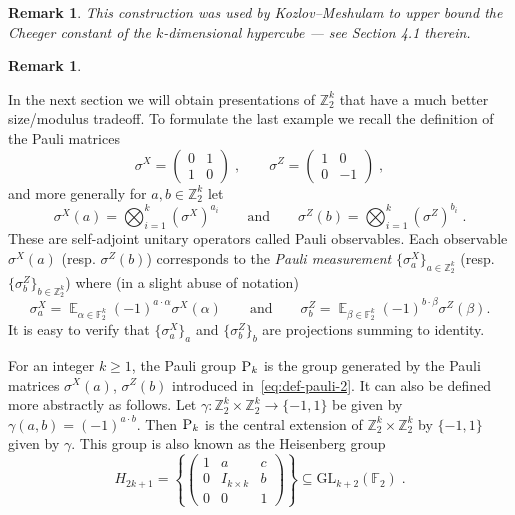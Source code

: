 \documentclass[11pt]{article}
\newtheorem{remark}[theorem]{Remark}
\theoremstyle{definition}
\DeclareMathOperator*{\Expectation}{\mathbb{E}}
\newcommand{\Es}[1]{\Expectation_{#1}}
\newcommand{\F}{\ensuremath{\mathbb{F}}}
\newcommand{\Z}{\ensuremath{\mathbb{Z}}}
\newcommand{\gamestyle}[1]{\ensuremath{\textsc{#1}}\xspace}
\newcommand{\pauli}{\gamestyle{P}}
\begin{document}
\begin{remark}
    This construction was used by Kozlov--Meshulam \cite{kozlov2019quantitative} to upper bound the Cheeger constant of the $k$-dimensional hypercube --- see Section 4.1 therein.
\end{remark}

\begin{remark}
    
\end{remark}

In the next section we will obtain presentations of $\Z_2^k$ that have a much better size/modulus tradeoff.
To formulate the last example we recall the definition of the Pauli matrices
	\begin{equation}\label{eq:def-pauli-1} \sigma^X = \begin{pmatrix} 0 & 1 \\ 1 & 0 \end{pmatrix}\;,\qquad \sigma^Z = \begin{pmatrix} 1 & 0 \\ 0 & -1\end{pmatrix}\;,
	\end{equation}
	and more generally for $a,b\in \Z_2^k$ let 
	\begin{equation}\label{eq:def-pauli-2}
	\sigma^X(a) = \bigotimes_{i=1}^k (\sigma^X)^{a_i}\qquad\text{and}\qquad\sigma^Z(b) = \bigotimes_{i=1}^k (\sigma^Z)^{b_i}\;.
	\end{equation}
These are self-adjoint unitary operators called Pauli observables. Each observable $\sigma^X(a)$ (resp. $\sigma^Z(b)$) corresponds to the \emph{Pauli measurement} $\{ \sigma^X_a \}_{a \in \Z_2^k}$ (resp. $\{ \sigma^Z_b \}_{b \in \Z_2^k}$) where (in a slight abuse of notation)  
	\[ \sigma^X_a = \Es{\alpha\in\F_2^k} (-1)^{a\cdot \alpha} \sigma^X(\alpha)\qquad\text{and}\qquad\sigma^Z_b = \Es{\beta\in\F_2^k} (-1)^{b\cdot\beta} \sigma^Z(\beta).\]
	It is easy to verify that $\{\sigma^X_a\}_a$ and $\{\sigma^Z_b\}_b$ are projections summing to identity.	
	
For an integer $k\geq 1$,  the Pauli group $\pauli_k$ is the group generated by the Pauli matrices $\sigma^X(a)$, $\sigma^Z(b)$ introduced in~\eqref{eq:def-pauli-2}. It can also be defined more abstractly as follows. Let $\gamma: \Z_2^k\times \Z_2^k \to \{-1,1\}$ be given by $\gamma(a,b)=(-1)^{a\cdot b}$. Then $\pauli_k$ is the central extension of $\Z_2^k\times \Z_2^k$ by $\{-1,1\}$ given by $\gamma$. This group 
is also known as the Heisenberg group 
\[ H_{2k+1} = \left \{ \begin{pmatrix} 1 & a & c \\ 0 & I_{k \times k} & b \\ 0 & 0 & 1 \end{pmatrix} \right\}\subseteq {\mathrm{GL}}_{k+2}(\F_2)\;.\]
 
\end{document}
